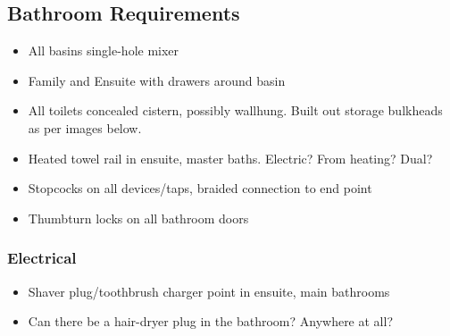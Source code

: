 \subsection{Bathroom Requirements}
\begin{itemize}
\item All basins single-hole mixer
\item Family and Ensuite with drawers around basin
\item All toilets concealed cistern, possibly wallhung. Built out storage bulkheads as per images below.
\item Heated towel rail in ensuite, master baths. Electric? From heating? Dual?
\item Stopcocks on all devices/taps, braided connection to end point
\item Thumbturn locks on all bathroom doors
\end{itemize}

\subsubsection{Electrical}
\begin{itemize}
\item Shaver plug/toothbrush charger point in ensuite, main bathrooms
\item Can there be a hair-dryer plug in the bathroom? Anywhere at all?
\end{itemize}

